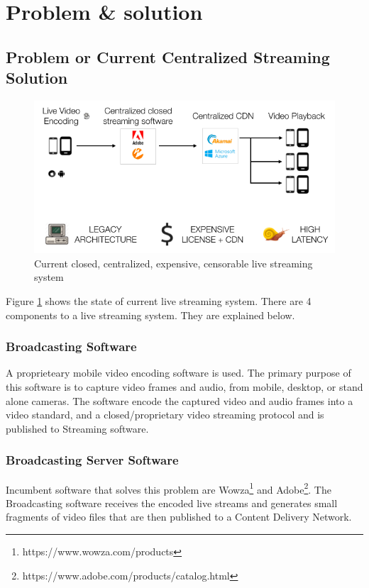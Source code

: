 \documentclass{article}
\begin{document}
\section{Problem \& solution}



\subsection{Problem or Current Centralized Streaming Solution}

\begin{figure}[h!]
  \centering
  \includegraphics[width=1.0\textwidth]{static/problem-architecture}
  \caption{Current closed, centralized, expensive, censorable live streaming system}
  \label{image:problem-architecture}
\end{figure}

Figure \ref{image:problem-architecture} shows the state of current live streaming system. There are 4 components to a live streaming system. They are explained below.
\subsubsection{Broadcasting Software}
A proprieteary mobile video encoding software is used. The primary purpose of this software is to capture video frames and audio, from mobile, desktop, or stand alone cameras. The software encode the captured video and audio frames into a video standard, and a closed/proprietary video streaming protocol and is published to Streaming software.

\subsubsection{Broadcasting Server Software}
Incumbent software that solves this problem are Wowza\footnote{https://www.wowza.com/products} and Adobe\footnote{https://www.adobe.com/products/catalog.html}. The Broadcasting software receives the encoded live streams and generates small fragments of video files that are then published to a Content Delivery Network.
\end{document}
